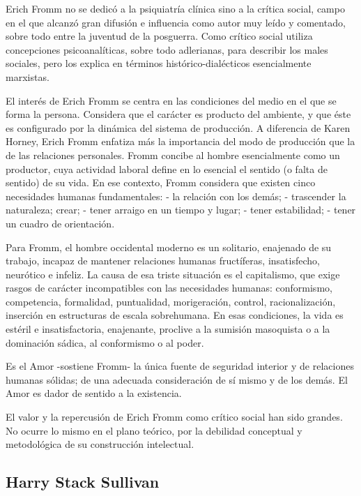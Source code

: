 \documentclass[
]{book}
\begin{document}
Erich Fromm no se dedicó a la psiquiatría clínica sino a la crítica social, campo en el que alcanzó gran difusión e influencia como autor muy leído y comentado, sobre todo entre la juventud de la posguerra. Como crítico social utiliza concepciones psicoanalíticas, sobre todo adlerianas, para describir los males sociales, pero los explica en términos histórico-dialécticos esencialmente marxistas.

El interés de Erich Fromm se centra en las condiciones del medio en el que se forma la persona. Considera que el carácter es producto del ambiente, y que éste es configurado por la dinámica del sistema de producción. A diferencia de Karen Horney, Erich Fromm enfatiza más la importancia del modo de producción que la de las relaciones personales. Fromm concibe al hombre esencialmente como un productor, cuya actividad laboral define en lo esencial el sentido (o falta de sentido) de su vida. En ese contexto, Fromm considera que existen cinco necesidades humanas fundamentales: - la relación con los demás; - trascender la naturaleza; crear; - tener arraigo en un tiempo y lugar; - tener estabilidad; - tener un cuadro de orientación.

Para Fromm, el hombre occidental moderno es un solitario, enajenado de su trabajo, incapaz de mantener relaciones humanas fructíferas, insatisfecho, neurótico e infeliz. La causa de esa triste situación es el capitalismo, que exige rasgos de carácter incompatibles con las necesidades humanas: conformismo, competencia, formalidad, puntualidad, morigeración, control, racionalización, inserción en estructuras de escala sobrehumana. En esas condiciones, la vida es estéril e insatisfactoria, enajenante, proclive a la sumisión masoquista o a la dominación sádica, al conformismo o al poder.

Es el Amor -sostiene Fromm- la única fuente de seguridad interior y de relaciones humanas sólidas; de una adecuada consideración de sí mismo y de los demás. El Amor es dador de sentido a la existencia.

El valor y la repercusión de Erich Fromm como crítico social han sido grandes. No ocurre lo mismo en el plano teórico, por la debilidad conceptual y metodológica de su construcción intelectual.

\hypertarget{harry-stack-sullivan}{%
\subsection*{Harry Stack Sullivan}\label{harry-stack-sullivan}}
\end{document}
